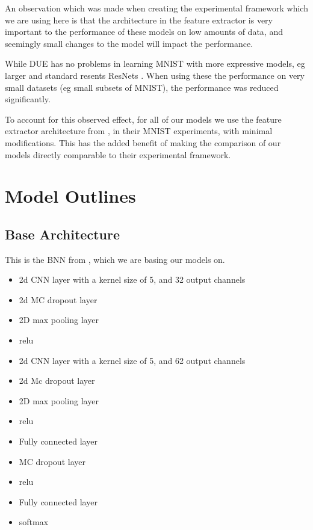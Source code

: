 \documentclass[12pt, a4paper]{report}
\theoremstyle{definition}
\theoremstyle{definition}
\theoremstyle{definition}
\begin{document}
An observation which was made when creating the experimental framework which we are using here is that the architecture in the feature extractor is very important to the performance of these models on low amounts of data, and seemingly small changes to the model will impact the performance.

While DUE has no problems in learning MNIST with more expressive models, eg larger and standard resents ResNets \cite{resnet}. When using these the performance on very small datasets (eg small subsets of MNIST), the performance was reduced significantly.


To account for this observed effect, for all of our models we use the feature extractor architecture from \cite{kirsch2019batchbald}, in their MNIST experiments, with minimal modifications. This has the added benefit of making the comparison of our models directly comparable to their experimental framework.


\section{Model Outlines}


\subsection{Base Architecture}

This is the BNN from \cite{kirsch2019batchbald}, which we are basing our models on.


\begin{itemize}
    \item 2d CNN layer with a kernel size of 5, and 32 output channels
    \item 2d MC dropout layer
    \item 2D max pooling layer
    \item relu
    \item 2d CNN layer with a kernel size of 5, and 62 output channels
    \item 2d Mc dropout layer
    \item 2D max pooling layer
    \item relu
    \item Fully connected layer
    \item MC dropout layer
    \item relu
    \item Fully connected layer
    \item softmax
\end{itemize}
\end{document}
